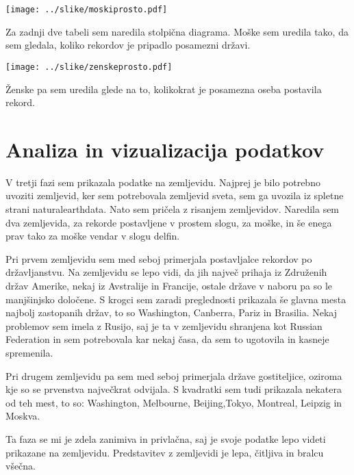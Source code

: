 \documentclass[11pt,a4paper]{article}
\begin{document}
\texttt{[image: ../slike/moskiprosto.pdf]}

Za zadnji dve tabeli sem naredila stolpična diagrama. Moške sem uredila tako, da sem gledala, koliko rekordov je pripadlo posamezni državi.

\texttt{[image: ../slike/zenskeprosto.pdf]}

Ženske pa sem uredila glede na to, kolikokrat je posamezna oseba postavila rekord.
\section{Analiza in vizualizacija podatkov}

V tretji fazi sem prikazala podatke na zemljevidu. Najprej je bilo potrebno uvoziti zemljevid, ker sem potrebovala zemljevid sveta, sem ga uvozila iz spletne strani naturalearthdata. Nato sem pričela z risanjem zemljevidov. Naredila sem dva zemljevida, za rekorde postavljene v prostem slogu, za moške, in še enega prav tako za moške vendar v slogu delfin. 



Pri prvem zemljevidu sem med seboj primerjala postavljalce rekordov po državljanstvu. Na zemljevidu se lepo vidi, da jih največ prihaja iz Združenih držav Amerike, nekaj iz Avstralije in Francije, ostale države v naboru pa so le manjšinjsko določene. S krogci sem zaradi preglednosti prikazala še glavna mesta najbolj zastopanih držav, to so Washington, Canberra, Pariz in Brasilia. Nekaj problemov sem imela z Rusijo, saj je ta v zemljevidu shranjena kot Russian Federation in sem potrebovala kar nekaj časa, da sem to ugotovila in kasneje spremenila. 


Pri drugem zemljevidu pa sem med seboj primerjala države gostiteljice, oziroma kje so se prvenstva največkrat odvijala. S kvadratki sem tudi prikazala nekatera od teh mest, to so: Washington, Melbourne, Beijing,Tokyo, Montreal, Leipzig in Moskva. 

Ta faza se mi je zdela zanimiva in privlačna, saj je svoje podatke lepo videti prikazane na zemljevidu. Predstavitev z zemljevidi je lepa, čitljiva in bralcu všečna. 
\end{document}
